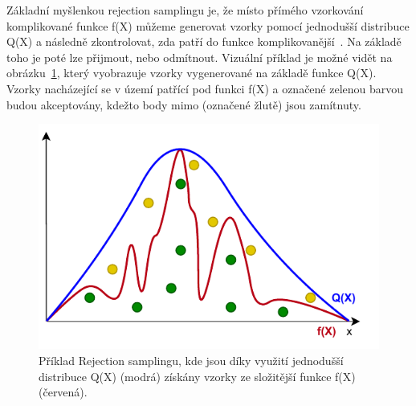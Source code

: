 Základní myšlenkou rejection samplingu je, že místo přímého vzorkování komplikované funkce f(X) můžeme generovat vzorky pomocí jednodušší distribuce Q(X) a následně zkontrolovat, zda patří do funkce komplikovanější~\cite{ghojogh2020sampling}. Na základě toho je poté lze přijmout, nebo odmítnout. Vizuální příklad je možné vidět na obrázku~\ref{fig:RA_graph}, který vyobrazuje vzorky vygenerované na základě funkce Q(X). Vzorky nacházející se v území patřící pod funkci f(X) a označené zelenou barvou budou akceptovány, kdežto body mimo (označené žlutě) jsou zamítnuty.

\vspace{0.3cm}
\begin{figure}[H]
    \centering
    \includegraphics[width=\textwidth]{obrazky-figures/ch2/RA_graph.pdf}
    \caption{Příklad Rejection samplingu, kde jsou díky využití jednodušší distribuce Q(X) (modrá) získány vzorky ze složitější funkce f(X) (červená).}
    \label{fig:RA_graph}
\end{figure}
\vspace{0.3cm}

